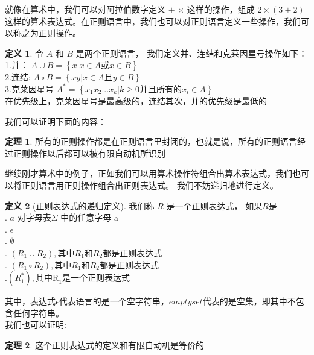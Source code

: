 \documentclass[openany,oneside]{book}
\theoremstyle{definition}
\newtheorem{definition}{\hspace{2em}定义}[chapter]
\newtheorem{theorem}{\hspace{2em}定理}[chapter]
\theoremstyle{definition}
\begin{document}
	就像在算术中，我们可以对阿拉伯数字定义 \(+\) \(\times\) 这样的操作，组成 \( 2 \times \left( 3 +2\right) \)这样的算术表达式。在正则语言中，我们也可以对正则语言定义一些操作，我们可以称之为正则操作。
	\begin{definition}
		令 \(A\) 和 \(B\) 是两个正则语言， 我们定义并、连结和克莱因星号操作如下：\\
		\indent \indent 1.并： \(A \cup B = \left\lbrace x|x \in A \mbox{或} x \in B \right\rbrace \)\\
		\indent \indent 2.连结: \(A \circ B = \left\lbrace xy| x \in A \mbox{且} y\in B \right\rbrace\)\\
		\indent \indent 3.克莱因星号 \(A^* = \left\lbrace x_1 x_2 ...x_k | k \ge 0 \mbox{并且所有的} x_i \in  A \right\rbrace\)\\
		\indent \indent 在优先级上，克莱因星号是最高级的，连结其次，并的优先级是最低的
	\end{definition}
	我们可以证明下面的内容：
	\begin{theorem}
		所有的正则操作都是在正则语言里封闭的，也就是说，所有的正则语言经过正则操作以后都可以被有限自动机所识别
	\end{theorem}

	
	\indent 继续刚才算术中的例子，正如我们可以用算术操作符组合出算术表达式，我们也可以将正则语言用正则操作组合出正则表达式。
	我们不妨递归地进行定义。
	\begin{definition}[正则表达式的递归定义]
		我们称 \(R\) 是一个正则表达式， 如果\(R\)是 \\
		\indent {}. \(a\) 对字母表\(\Sigma\) 中的任意字母 a\\
		\indent {}. \(\epsilon\)\\
		\indent {}. $\emptyset$\\
		\indent {}. \(\left(  R_1 \cup R_2 \right) ,\mbox{其中}R_1\mbox{和}R_2 \mbox{都是正则表达式}  \)\\
		\indent {}. \( \left( R_1 \circ R_2 \right),\mbox{其中}R_1\mbox{和}R_2\mbox{都是正则表达式}\)\\
		\indent {}.\(\left( R_1^* \right) , \mbox{其中R}_1\mbox{是一个正则表达式}\)\\
		\indent 
	\end{definition}
	其中，表达式\(\epsilon\)代表语言的是一个空字符串，\(emptyset\)代表的是空集，即其中不包含任何字符串。\\
	\indent 我们也可以证明:
	\begin{theorem}
		这个正则表达式的定义和有限自动机是等价的
	\end{theorem}
\end{document}
